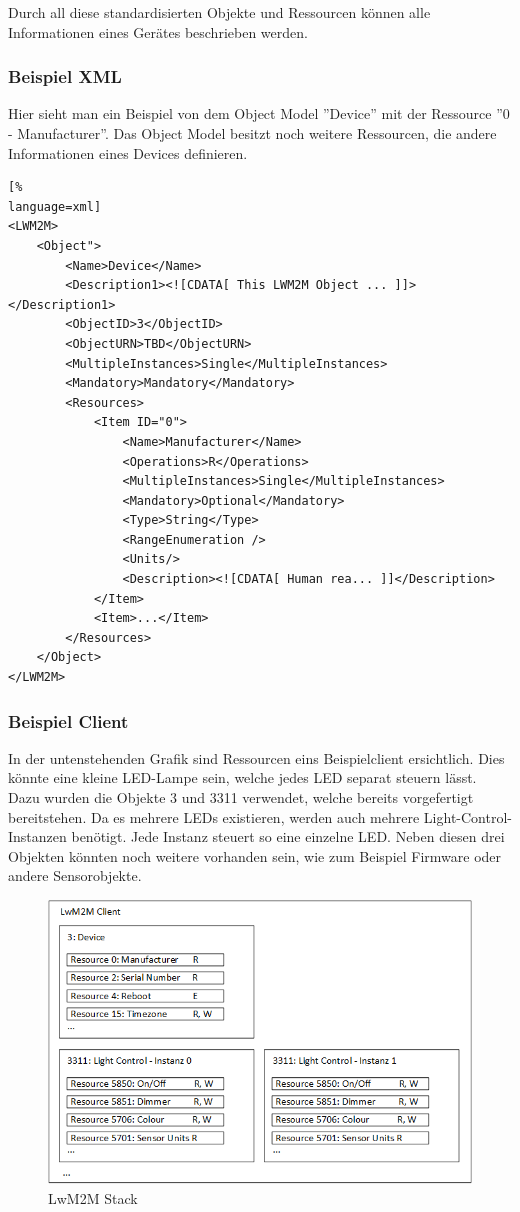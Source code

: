 Durch all diese standardisierten Objekte und Ressourcen können alle Informationen eines Gerätes beschrieben werden.
\subsubsection{Beispiel XML}
Hier sieht man ein Beispiel von dem Object Model ''Device'' mit der Ressource ''0 - Manufacturer''. Das Object Model besitzt noch weitere Ressourcen, die andere Informationen eines Devices definieren.
\begin{lstlisting}[%
language=xml]
<LWM2M>
	<Object">
		<Name>Device</Name>
		<Description1><![CDATA[ This LWM2M Object ... ]]></Description1>
		<ObjectID>3</ObjectID>
		<ObjectURN>TBD</ObjectURN>
		<MultipleInstances>Single</MultipleInstances>
		<Mandatory>Mandatory</Mandatory>
		<Resources>
			<Item ID="0">
				<Name>Manufacturer</Name>
				<Operations>R</Operations>
				<MultipleInstances>Single</MultipleInstances>
				<Mandatory>Optional</Mandatory>
				<Type>String</Type>
				<RangeEnumeration />
				<Units/>
				<Description><![CDATA[ Human rea... ]]</Description>
			</Item>
			<Item>...</Item>
		</Resources>
	</Object>
</LWM2M>
\end{lstlisting}

\subsubsection{Beispiel Client}
In der untenstehenden Grafik sind Ressourcen eins Beispielclient ersichtlich. Dies könnte eine kleine LED-Lampe sein, welche jedes LED separat steuern lässt. Dazu wurden die Objekte 3 und 3311 verwendet, welche bereits vorgefertigt bereitstehen. Da es mehrere LEDs existieren, werden auch mehrere Light-Control-Instanzen benötigt. Jede Instanz steuert so eine einzelne LED.
Neben diesen drei Objekten könnten noch weitere vorhanden sein, wie zum Beispiel Firmware oder andere Sensorobjekte.
\begin{figure}[H]
\includegraphics[scale=0.65]{../02_Analyse/images/lwm2m/lwm2m_client.png}
\caption{LwM2M Stack}
\end{figure}

